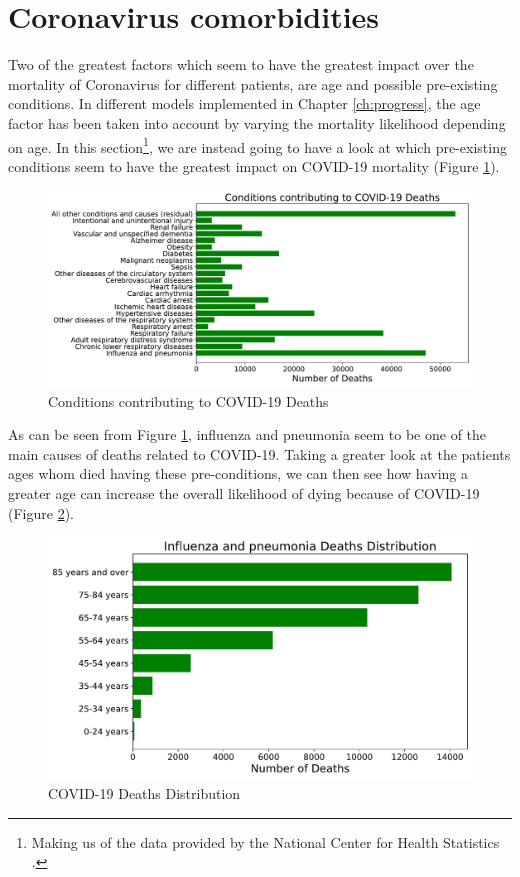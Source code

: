 \section{Coronavirus comorbidities}
\label{como_app}
Two of the greatest factors which seem to have the greatest impact over the mortality of Coronavirus for different patients, are age and possible pre-existing conditions. In different models implemented in Chapter \ref{ch:progress}, the age factor has been taken into account by varying the mortality likelihood depending on age. In this section\footnote{Making us of the data provided by the National Center for Health Statistics \cite{deaths_data}.}, we are instead going to have a look at which pre-existing conditions seem to have the greatest impact on COVID-19 mortality (Figure \ref{d_cond}). 

\begin{figure}[ht!]%
    \centering
    \includegraphics[width=0.85\linewidth]{latex/images/deaths_conditions.pdf}
    \vspace{-0.2cm}
    \caption{Conditions contributing to COVID-19 Deaths}
    \label{d_cond}
\end{figure}

As can be seen from Figure \ref{d_cond}, influenza and pneumonia seem to be one of the main causes of deaths related to COVID-19. Taking a greater look at the patients ages whom died having these pre-conditions, we can then see how having a greater age can increase the overall likelihood of dying because of COVID-19 (Figure \ref{d_top}).

\begin{figure}[ht!]%
    \centering
    \includegraphics[width=0.65\linewidth]{latex/images/deaths_top.pdf}
    \vspace{-0.2cm}
    \caption{COVID-19 Deaths Distribution}
    \label{d_top}
\end{figure}

